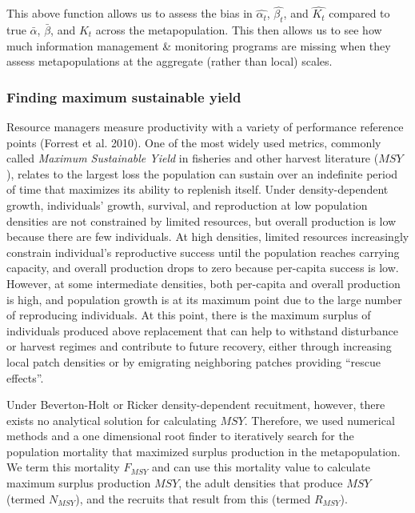 \documentclass[
]{article}
\begin{document}
This above function allows us to assess the bias in \(\hat{\alpha_t}\),
\(\hat{\beta_t}\), and \(\hat{K_t}\) compared to true \(\bar{\alpha}\),
\(\bar{\beta}\), and \({K}_t\) across the metapopulation. This then
allows us to see how much information management \& monitoring programs
are missing when they assess metapopulations at the aggregate (rather
than local) scales.

\hypertarget{finding-maximum-sustainable-yield}{%
\subsubsection{Finding maximum sustainable
yield}\label{finding-maximum-sustainable-yield}}

Resource managers measure productivity with a variety of performance
reference points (Forrest et al. 2010). One of the most widely used
metrics, commonly called \emph{Maximum Sustainable Yield} in fisheries
and other harvest literature (\(MSY\)), relates to the largest loss the
population can sustain over an indefinite period of time that maximizes
its ability to replenish itself. Under density-dependent growth,
individuals' growth, survival, and reproduction at low population
densities are not constrained by limited resources, but overall
production is low because there are few individuals. At high densities,
limited resources increasingly constrain individual's reproductive
success until the population reaches carrying capacity, and overall
production drops to zero because per-capita success is low. However, at
some intermediate densities, both per-capita and overall production is
high, and population growth is at its maximum point due to the large
number of reproducing individuals. At this point, there is the maximum
surplus of individuals produced above replacement that can help to
withstand disturbance or harvest regimes and contribute to future
recovery, either through increasing local patch densities or by
emigrating neighboring patches providing ``rescue effects''.

Under Beverton-Holt or Ricker density-dependent recuitment, however,
there exists no analytical solution for calculating \(MSY\). Therefore,
we used numerical methods and a one dimensional root finder to
iteratively search for the population mortality that maximized surplus
production in the metapopulation. We term this mortality \(F_{MSY}\) and
can use this mortality value to calculate maximum surplus production
\(MSY\), the adult densities that produce \(MSY\) (termed \(N_{MSY}\)),
and the recruits that result from this (termed \(R_{MSY}\)).
\end{document}
